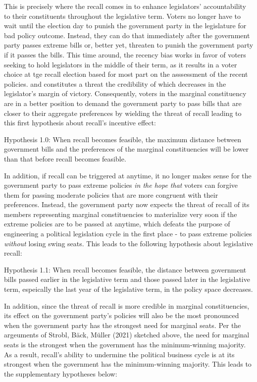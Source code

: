 \documentclass[hyphens, crop=false]{standalone}
\begin{document}
	This is precisely where the recall comes in
	to enhance legislators' accountability to their constituents
	throughout the legislative term.
	Voters no longer have to wait until the election day
	to punish the government party in the legislature for bad policy outcome.
	Instead,
	they can do that immediately after the government party passes extreme bills or,
	better yet,
	threaten to punish the government party if it passes the bills.
	This time around,
	the recency bias works in favor of voters
	seeking to hold legislators in the middle of their term,
	as it results in a voter choice at tge recall election
	based for most part on the asssessment of the recent policies.
	and
	constitutes a threat the credibility of which decreases in the
	legislator's margin of victory.
	Consequently,
	voters in the marginal constituency are in a better position to
	demand the government party to pass bills that
	are closer to their aggregate preferences
	by wielding the threat of recall leading to this first hypothesis
	about recall's incentive effect:
	
	Hypothesis 1.0: When recall becomes feasible,
	the maximum distance between government bills
	and the preferences of the marginal constituencies will be lower
	than that before recall becomes feasible.
	
	In addition,
	if recall can be triggered at anytime,
	it no longer makes sense
	for the government party
	to pass extreme policies
	\textit{in the hope that}
	voters can forgive them for passing moderate policies
	that are more congruent with their preferences.
	Instead,
	the government party now expects the threat of recall 
	of its members representing marginal constituencies
	to materialize very soon if the extreme policies are to be passed
	at anytime,
	which defeats the purpose of engineering a political legislation cycle in the first place -
	to pass extreme policies \textit{without} losing swing seats.
	This leads to the following hypothesis about legislative recall:
	
	Hypothesis 1.1: When recall becomes feasible,
	the distance between government bills passed earlier in the legislative term
	and those passed later in the legislative term,
	espeically the last year of the legislative term,
	in the policy space decreases.
	
	
	In addition,
	since
	the threat of recall is more credible in marginal constituencies,
	its effect on the government party's policies
	will also be the most pronounced when the government party
	has the strongest need for marginal seats.
	Per the argeuments of
	Strobl, Bäck, Müller (2021)
	sketched above,
	the need for marginal seats is the strongest
	when the government has the minimum-winning majority.
	As a result, recall's ability to undermine the political business cycle
	is at its strongest when the government has the minimum-winning majority.
	This leads to the supplementary hypotheses below:
	
\end{document}
